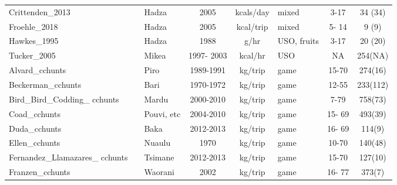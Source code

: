 \begin{landscape}
\begin{longtable}{M{2.6cm} M{3.6cm} M{1.5cm} c c M{1cm} c c}
Crittenden\_2013               & \cite{crittenden_juvenile_2013}           & Hadza           & 2005       & kcals/day & mixed              & 3-17    & 34 (34)     \\
Froehle\_2018                  & \cite{froehle_physical_2019}              & Hadza           & 2005       & kcal/trip & mixed              & 5- 14   & 9 (9)       \\
Hawkes\_1995                   & \cite{hawkes_hadza_1995}                  & Hadza           & 1988       & g/hr      & USO, fruits        & 3-17    & 20 (20)     \\
Tucker\_2005                   & \cite{tucker_growing_2005}                & Mikea           & 1997- 2003 & kcal/hr   & USO                & NA      & 254(NA)     \\
Alvard\_cchunts                & \cite{alvard_shotguns_1995}               & Piro            & 1989-1991  & kg/trip   & game               & 15-70   & 274(16)     \\
Beckerman\_cchunts             & \cite{beckerman_ecology_2013}             & Bari            & 1970-1972  & kg/trip   & game               & 12-55   & 233(112)    \\
Bird\_Bird\_Codding\_ cchunts     & \cite{bird_pursuit_2009}                  & Mardu           & 2000-2010  & kg/trip   & game               & 7-79    & 758(73)     \\
Coad\_cchunts                  & \cite{coad_bushmeat_2008}                 & Pouvi, etc    & 2004-2010  & kg/trip   & game               & 15- 69  & 493(39)     \\
Duda\_cchunts                  & \cite{reyes-garcia_adaptive_2016}         & Baka            & 2012-2013  & kg/trip   & game               & 16- 69  & 114(9)      \\
Ellen\_cchunts                 & \cite{ellen_individual_1996}              & Nuaulu          & 1970       & kg/trip   & game               & 10-70   & 140(48)     \\
Fernandez\_Llamazares\_ cchunts  & \cite{reyes-garcia_adaptive_2016}         & Tsimane         & 2012-2013  & kg/trip   & game               & 15-70   & 127(10)     \\
Franzen\_cchunts               & \cite{franzen_evaluating_2006}            & Waorani         & 2002       & kg/trip   & game               & 16- 77  & 373(7)      \\

\end{longtable}
\end{landscape}
